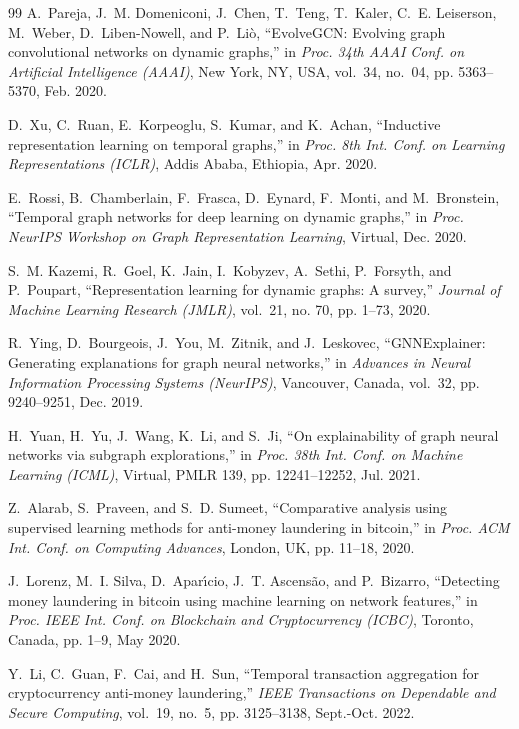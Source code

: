 \begin{thebibliography}{99}
A.~Pareja, J.~M. Domeniconi, J.~Chen, T.~Teng, T.~Kaler, C.~E. Leiserson, M.~Weber, D.~Liben-Nowell, and P.~Li{\`{o}}, ``EvolveGCN: Evolving graph convolutional networks on dynamic graphs,'' in \emph{Proc. 34th AAAI Conf. on Artificial Intelligence (AAAI)}, New York, NY, USA, vol.~34, no.~04, pp. 5363--5370, Feb. 2020.

D.~Xu, C.~Ruan, E.~Korpeoglu, S.~Kumar, and K.~Achan, ``Inductive representation learning on temporal graphs,'' in \emph{Proc. 8th Int. Conf. on Learning Representations (ICLR)}, Addis Ababa, Ethiopia, Apr. 2020.

E.~Rossi, B.~Chamberlain, F.~Frasca, D.~Eynard, F.~Monti, and M.~Bronstein, ``Temporal graph networks for deep learning on dynamic graphs,'' in \emph{Proc. NeurIPS Workshop on Graph Representation Learning}, Virtual, Dec. 2020.

S.~M. Kazemi, R.~Goel, K.~Jain, I.~Kobyzev, A.~Sethi, P.~Forsyth, and P.~Poupart, ``Representation learning for dynamic graphs: A survey,'' \emph{Journal of Machine Learning Research (JMLR)}, vol.~21, no. 70, pp. 1--73, 2020.

R.~Ying, D.~Bourgeois, J.~You, M.~Zitnik, and J.~Leskovec, ``GNNExplainer: Generating explanations for graph neural networks,'' in \emph{Advances in Neural Information Processing Systems (NeurIPS)}, Vancouver, Canada, vol.~32, pp. 9240--9251, Dec. 2019.

H.~Yuan, H.~Yu, J.~Wang, K.~Li, and S.~Ji, ``On explainability of graph neural networks via subgraph explorations,'' in \emph{Proc. 38th Int. Conf. on Machine Learning (ICML)}, Virtual, PMLR 139, pp. 12241--12252, Jul. 2021.

Z.~Alarab, S.~Praveen, and S.~D. Sumeet, ``Comparative analysis using supervised learning methods for anti-money laundering in bitcoin,'' in \emph{Proc. ACM Int. Conf. on Computing Advances}, London, UK, pp. 11--18, 2020.

J.~Lorenz, M.~I. Silva, D.~Apar{\'{\i}}cio, J.~T. Ascens{\~{a}}o, and P.~Bizarro, ``Detecting money laundering in bitcoin using machine learning on network features,'' in \emph{Proc. IEEE Int. Conf. on Blockchain and Cryptocurrency (ICBC)}, Toronto, Canada, pp. 1--9, May 2020.

Y.~Li, C.~Guan, F.~Cai, and H.~Sun, ``Temporal transaction aggregation for cryptocurrency anti-money laundering,'' \emph{IEEE Transactions on Dependable and Secure Computing}, vol.~19, no.~5, pp. 3125--3138, Sept.-Oct. 2022.


\end{thebibliography}
